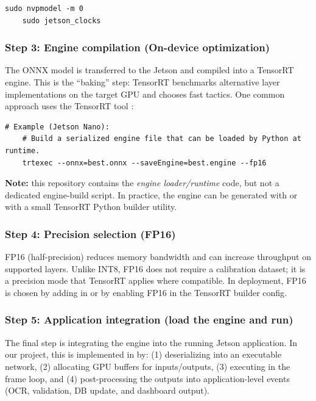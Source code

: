 \begin{lstlisting}[language=MyBash,style=bashstyle,caption={Jetson Nano: lock performance profile for deployment testing},label={lst:jetson_perf_lock}]
	sudo nvpmodel -m 0
	sudo jetson_clocks
\end{lstlisting}

\subsubsection*{Step 3: Engine compilation (On-device optimization)}
\noindent
The ONNX model is transferred to the Jetson and compiled into a TensorRT engine.
This is the ``baking'' step: TensorRT benchmarks alternative layer implementations on the target GPU and chooses fast tactics.
One common approach uses the TensorRT tool :

\begin{lstlisting}[language=MyBash,style=bashstyle,caption={Example: build \PATH{best.engine} from ONNX on the Jetson},label={lst:trtexec_build_engine}]
	# Example (Jetson Nano):
	# Build a serialized engine file that can be loaded by Python at runtime.
	trtexec --onnx=best.onnx --saveEngine=best.engine --fp16
\end{lstlisting}

\noindent
\textbf{Note:} this repository contains the \emph{engine loader/runtime} code, but not a dedicated engine-build script.
In practice, the engine can be generated with  or with a small TensorRT Python builder utility.

\subsubsection*{Step 4: Precision selection (FP16)}
\noindent
FP16 (half-precision) reduces memory bandwidth and can increase throughput on supported layers.
Unlike INT8, FP16 does not require a calibration dataset; it is a precision mode that TensorRT applies where compatible.
In deployment, FP16 is chosen by adding  in  or by enabling FP16 in the TensorRT builder config.

\subsubsection*{Step 5: Application integration (load the engine and run)}
\noindent
The final step is integrating the engine into the running Jetson application.
In our project, this is implemented in  by:
(1) deserializing  into an executable network,
(2) allocating GPU buffers for inputs/outputs,
(3) executing  in the frame loop, and
(4) post-processing the outputs into application-level events (OCR, validation, DB update, and dashboard output).

